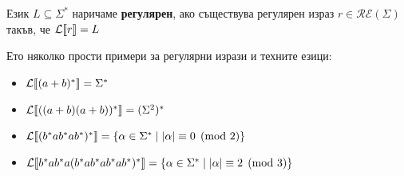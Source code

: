 \begin{definition}
    Език $L \subseteq \Sigma^*$ наричаме \textbf{регулярен}, ако съществува регулярен израз $r \in \mathcal{RE}(\Sigma)$ такъв, че $\mathcal{L}\llbracket r \rrbracket = L$
\end{definition}

Ето няколко прости примери за регулярни изрази и техните езици:
\begin{itemize}
    \item $\mathcal{L}\llbracket (a+b)^* \rrbracket = \Sigma^*$
    \item $\mathcal{L}\llbracket ((a+b)(a+b))^* \rrbracket =(\Sigma^2)^*$
    \item $\mathcal{L}\llbracket (b^*ab^*ab^*)^* \rrbracket = \{ \alpha \in \Sigma^* \mid |\alpha| \equiv 0 \pmod{2} \}$
    \item $\mathcal{L}\llbracket b^*ab^*a(b^*ab^*ab^*ab^*)^* \rrbracket = \{ \alpha \in \Sigma^* \mid |\alpha| \equiv 2 \pmod{3} \}$
\end{itemize}

